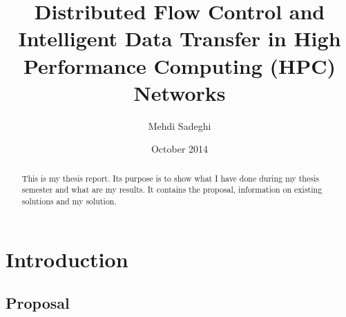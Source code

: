 \documentclass[12pt]{article}
\begin{document}
\nocite{*}

\title{Distributed Flow Control and Intelligent Data Transfer in High Performance Computing (HPC) Networks}
\author{Mehdi Sadeghi}
\date{October 2014}

\maketitle

\begin{abstract}
This is my thesis report. Its purpose is to show what I have done during my thesis semester and what are my results. It contains the proposal,
information on existing solutions and my solution.
\end{abstract}

\section{Introduction}
\subsection{Proposal}








\end{document}
